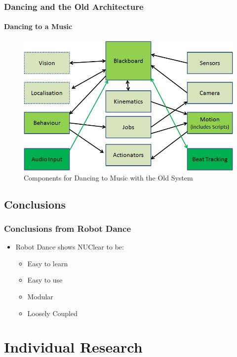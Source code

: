 \documentclass{beamer}
\begin{document}
	\begin{frame}
		\frametitle{Dancing and the Old Architecture}
		\framesubtitle{Dancing to a Music}
		\begin{figure}
			\centering
			\includegraphics[scale=.45]{Presentation_Images/dance_audio_old_arc.png}
			\caption{Components for Dancing to Music with the Old System}
		\end{figure}
	\end{frame}	
	\subsection{Conclusions} %
	\begin{frame}
		\frametitle{Conclusions from Robot Dance}
			\begin{itemize}
				\item Robot Dance shows NUClear to be:
				\begin{itemize}
					\item Easy to learn
					\item Easy to use
					\item Modular
					\item Loosely Coupled
				\end{itemize}
			\end{itemize}
	\end{frame}	




\section{Individual Research}
\begin{frame}
	\sectionpage
\end{frame}
\end{document}
